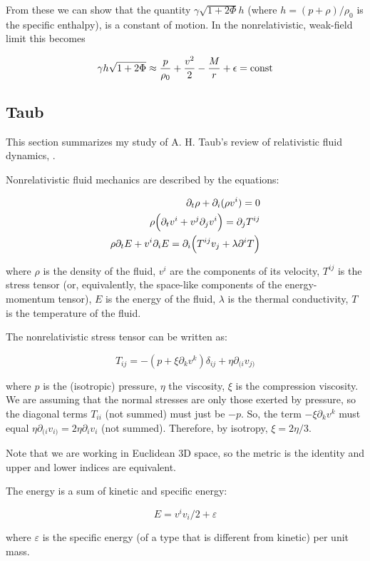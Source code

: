 From these we can show that the quantity $\gamma \sqrt{1+2\Phi} h$ (where $h = (p+\rho)/\rho_0$ is the specific enthalpy), is a constant of motion.
In the nonrelativistic, weak-field limit this  becomes

\begin{equation}
    \gamma h \sqrt{1+2\Phi} \approx \frac{p}{\rho_0} + \frac{v^2}{2} - \frac{M}{r} + \epsilon = \text{const}
\end{equation}


\subsection{Taub}

This section summarizes my study of A. H. Taub's review of relativistic fluid dynamics, \cite{taub}.

Nonrelativistic fluid mechanics are described by the equations:

\begin{align}
    \partial_t \rho + \partial_i (\rho v^i) =0 \\
    \rho \qty(\partial_t v^i + v^j \partial_j v^i) = \partial_j T^{ij} \\
    \rho \partial_t E + v^i \partial_i E = \partial_i \qty(T^{ij}v_j + \lambda\partial^i T)
\end{align}

where $\rho$ is the density of the fluid,
$v^i$ are the components of its velocity,
$T^{ij}$ is the stress tensor (or, equivalently, the space-like components of the energy-momentum tensor),
$E$ is the energy of the fluid,
$\lambda$ is the thermal conductivity,
$T$ is the temperature of the fluid.

The nonrelativistic stress tensor can be written as:

\begin{equation}
    T_{ij} = -(p + \xi \partial_k v^k ) \delta_{ij} + \eta \partial_{(i} v_{j)}
\end{equation}

where $p$ is the (isotropic) pressure, $\eta$ the viscosity, $\xi$ is the compression viscosity. We are assuming that the normal stresses are only those exerted by pressure, so the diagonal terms $T_{ii}$ (not summed) must just be $-p$. So, the term $-\xi \partial_k v^k$ must equal $\eta \partial_{(i} v_{i)} = 2\eta \partial_i v_i$ (not summed). Therefore, by isotropy, $\xi = 2\eta/3$.

Note that we are working in Euclidean 3D space, so the metric is the identity and upper and lower indices are equivalent.

The energy is a sum of kinetic and specific energy:

\begin{equation}
    E = v^i v_i /2 + \varepsilon
\end{equation}

where $\varepsilon$ is the specific energy (of a type that is different from kinetic) per unit mass.
